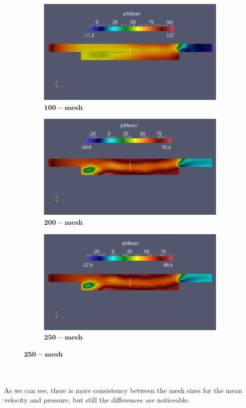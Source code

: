 \documentclass[a4paper,english,11pt,twoside]{article}
\begin{document}
\begin{figure}[h!]
	\begin{subfigure}{0.3\textwidth}
		\includegraphics[width=0.95\linewidth]{piso_10_filteredLinear_mean_p.png}
		\caption{$\mathbf{100-mesh}$}
	\end{subfigure}
	\begin{subfigure}{0.3\textwidth}
		\includegraphics[width=0.95\linewidth]{piso_20_filteredLinear_mean_p.png}
		\caption{$\mathbf{200-mesh}$}
	\end{subfigure}
	\begin{subfigure}{0.3\textwidth}
		\includegraphics[width=0.95\linewidth]{piso_25_filteredLinear_mean_p.png}
		\caption{$\mathbf{250-mesh}$}
	\end{subfigure}
\end{figure}\\
\\
As we can see, there is more consistency between the mesh sizes for the mean velocity and pressure, but still the differences are noticeable.
\end{document}
